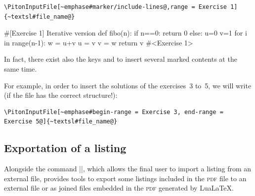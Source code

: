 \documentclass{article}
\begin{document}
\begin{Verbatim}
\PitonInputFile[~emphase#marker/include-lines@,range = Exercise 1]{~textsl#file_name@}
\end{Verbatim}

\begin{Piton}
#[Exercise 1] Iterative version
def fibo(n):
    if n==0: return 0 
    else:
        u=0
        v=1
        for i in range(n-1):
            w = u+v
            u = v
            v = w
        return v
#<Exercise 1>
\end{Piton}


\bigskip
{}
In fact, there exist also the keys  and
 to insert several marked contents at the same time.

For example, in order to insert the solutions of the exercises~3 to~5, we will
write (if the file has the correct structure!):


\begin{Verbatim}
\PitonInputFile[~emphase#begin-range = Exercise 3, end-range = Exercise 5@]{~textsl#file_name@}
\end{Verbatim}


\subsection{Exportation of a listing}

Alongside the command |\PitonInputFile|, which allows the final user to import a
listing from an external file,  provides tools to export some listings
included in the \textsc{pdf} file to an external file or as joined files embedded in
the \textsc{pdf} generated by LuaLaTeX.
\end{document}
